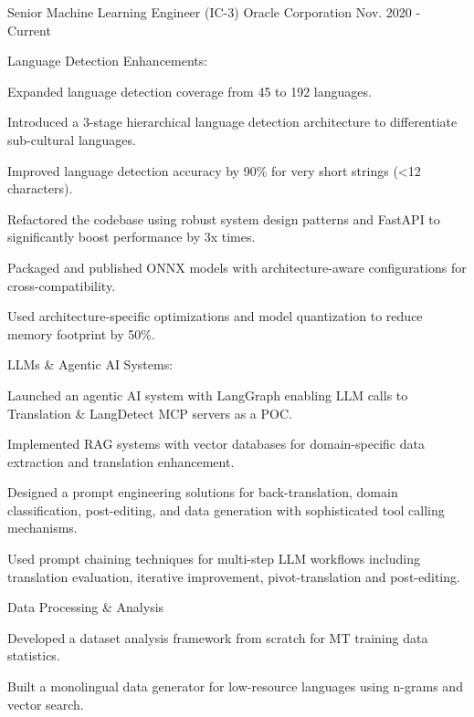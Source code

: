 \begin{cventries}
  \cvexperience
    {Senior Machine Learning Engineer (IC-3)}
    {Oracle Corporation}
    {}
    {}
    {Nov. 2020 - Current}
    {
      \begin{cvitemswithheading}
        {Language Detection Enhancements:}
        \item {Expanded language detection coverage from 45 to 192 languages.}
        \item {Introduced a 3-stage hierarchical language detection architecture to differentiate sub-cultural languages.}
        \item {Improved language detection accuracy by 90\% for very short strings (<12 characters).}
        \item {Refactored the codebase using robust system design patterns and FastAPI to significantly boost performance by 3x times.}
        \item {Packaged and published ONNX models with architecture-aware configurations for cross-compatibility.}
        \item {Used architecture-specific optimizations and model quantization to reduce memory footprint by 50\%.}
      \end{cvitemswithheading}
    }
  \cvexpproj
  {
    \begin{cvitemswithheading}
        {LLMs \& Agentic AI Systems:}
        \item {Launched an agentic AI system with LangGraph enabling LLM calls to Translation \& LangDetect MCP servers as a POC.}
        \item {Implemented RAG systems with vector databases for domain-specific data extraction and translation enhancement.}
        \item {Designed a prompt engineering solutions for back-translation, domain classification, post-editing, and data generation with sophisticated tool calling mechanisms.}
        \item {Used prompt chaining techniques for multi-step LLM workflows including translation evaluation, iterative improvement, pivot-translation and post-editing.}
      \end{cvitemswithheading}
  }
  \cvexpproj
  {
    \begin{cvitemswithheading}
        {Data Processing \& Analysis}
         \item {Developed a dataset analysis framework from scratch for MT training data statistics.}
        \item {Built a monolingual data generator for low-resource languages using n-grams and vector search.}

\end{cvitemswithheading}}
\end{cventries}
